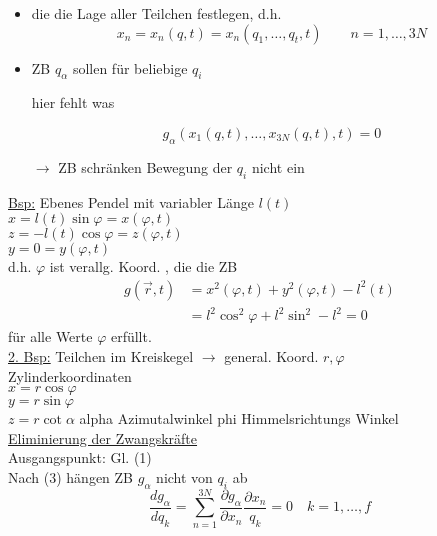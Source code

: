 \documentclass[titlepage,12pt,a4paper,ngerman]{report}
\begin{document}
\begin{itemize}
	\item die die Lage aller Teilchen festlegen, d.h.\\
	\begin{equation*}
	x_n = x_n (q,t) = x_n (q_1, \dots , q_t, t) \qquad n = 1,\dots,3N \tag{2}
	\end{equation*}
	\item ZB $ q_\alpha $ sollen für beliebige $ q_i $  
	
	hier fehlt was
	
	
	\begin{equation*}
	g_\alpha (x_1(q,t) , \dots , x_{3N} (q,t), t ) = 0 \tag{3}
	\end{equation*}
	\item[$ \rightarrow $] ZB schränken Bewegung der $ q_i $ nicht ein
\end{itemize}
\underline{Bsp:} Ebenes Pendel mit variabler Länge $ l(t) $\\
$ x = l(t) \sin \varphi = x(\varphi,t)$\\
$ z = - l(t) \cos \varphi = z(\varphi,t)$\\
$ y = 0 = y(\varphi,t)$\\
d.h. $ \varphi $ ist verallg. Koord. , die die ZB\\
\begin{align*}
g(\vec{r},t) &= x^2 ( \varphi,t) + y^2 ( \varphi,t ) - l^2(t) \\
&= l^2 \cos^2 \varphi + l^2 \sin^2  - l^2 = 0
\end{align*}
für alle Werte $ \varphi $ erfüllt.\\
\underline{2. Bsp:} Teilchen im Kreiskegel $ \rightarrow $ general. Koord. $ r,\varphi $\\
Zylinderkoordinaten\\
$ x = r \cos \varphi $\\
$ y = r \sin \varphi $\\
$ z = r \cot \alpha $ alpha Azimutalwinkel phi Himmelsrichtungs Winkel\\
\underline{Eliminierung der Zwangskräfte}\\
Ausgangspunkt: Gl. (1)\\
Nach (3) hängen ZB $ g_\alpha $ nicht von $ q_i $ ab
\begin{equation*}
\frac{d g_\alpha}{ d q_k} = \sum_{n=1}^{3N} \frac{\partial g_\alpha}{\partial x_n} \frac{\partial x_n}{q_k} = 0 \quad k = 1, \dots , f \tag{4}
\end{equation*}
\end{document}
